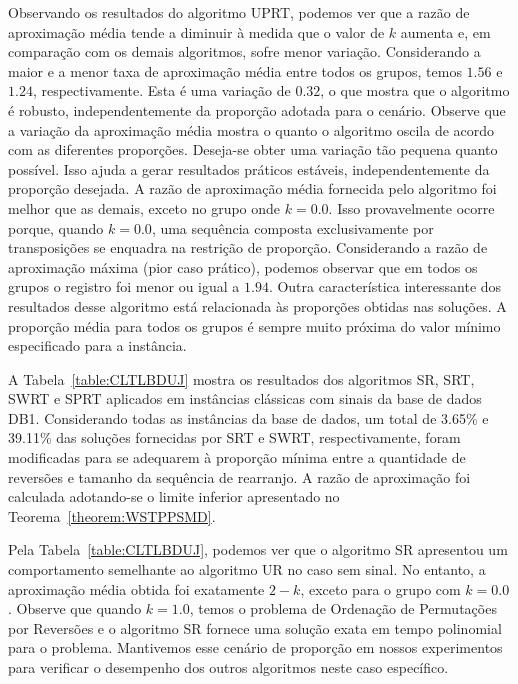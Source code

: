 Observando os resultados do algoritmo UPRT, podemos ver que a razão de aproximação média tende a diminuir à medida que o valor de $k$ aumenta e, em comparação com os demais algoritmos, sofre menor variação. Considerando a maior e a menor taxa de aproximação média entre todos os grupos, temos $1.56$ e $1.24$, respectivamente. Esta é uma variação de $0.32$, o que mostra que o algoritmo é robusto, independentemente da proporção adotada para o cenário. Observe que a variação da aproximação média mostra o quanto o algoritmo oscila de acordo com as diferentes proporções. Deseja-se obter uma variação tão pequena quanto possível. Isso ajuda a gerar resultados práticos estáveis, independentemente da proporção desejada. A razão de aproximação média fornecida pelo algoritmo foi melhor que as demais, exceto no grupo onde $k = 0.0$. Isso provavelmente ocorre porque, quando $k = 0.0$, uma sequência composta exclusivamente por transposições se enquadra na restrição de proporção. Considerando a razão de aproximação máxima (pior caso prático), podemos observar que em todos os grupos o registro foi menor ou igual a $1.94$. Outra característica interessante dos resultados desse algoritmo está relacionada às proporções obtidas nas soluções. A proporção média para todos os grupos é sempre muito próxima do valor mínimo especificado para a instância.

A Tabela~\ref{table:CLTLBDUJ} mostra os resultados dos algoritmos SR, SRT, SWRT e SPRT aplicados em instâncias clássicas com sinais da base de dados DB1. Considerando todas as instâncias da base de dados, um total de 3.65\% e 39.11\% das soluções fornecidas por SRT e SWRT, respectivamente, foram modificadas para se adequarem à proporção mínima entre a quantidade de reversões e tamanho da sequência de rearranjo. A razão de aproximação foi calculada adotando-se o limite inferior apresentado no Teorema~\ref{theorem:WSTPPSMD}.



Pela Tabela~\ref{table:CLTLBDUJ}, podemos ver que o algoritmo SR apresentou um comportamento semelhante ao algoritmo UR no caso sem sinal. No entanto, a aproximação média obtida foi exatamente $2 - k$, exceto para o grupo com $k = 0.0$. Observe que quando $k=1.0$, temos o problema de Ordenação de Permutações por Reversões e o algoritmo SR fornece uma solução exata em tempo polinomial para o problema. Mantivemos esse cenário de proporção em nossos experimentos para verificar o desempenho dos outros algoritmos neste caso específico.

